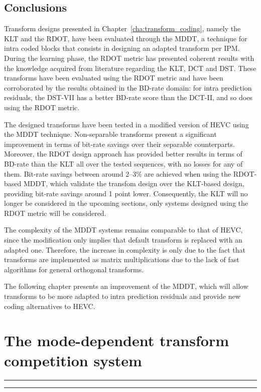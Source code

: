 \documentclass[11pt,a4paper,openright,twoside]{book}
\providecommand{\chaptertoc}{
	\startcontents[chapters]
	\hrule
	\vspace{1em}
	\printcontents[chapters]{}{1}{{\sf\large\bfseries Contents}}
	\hrule
}
\numberwithin{equation}{section} %
\numberwithin{figure}{section} %
\numberwithin{table}{section} %
\begin{document}
\section{Conclusions}
\label{sec:conclusions}

Transform designs presented in Chapter~\ref{cha:transform_coding}, namely the
\ac{KLT} and the \ac{RDOT}, have been evaluated through the \ac{MDDT}, a
technique for intra coded blocks that consists in designing an adapted
transform per \ac{IPM}.
During the learning phase, the \ac{RDOT} metric has presented coherent results
with the knowledge acquired from literature regarding the \ac{KLT}, \ac{DCT}
and \ac{DST}.
These transforms have been evaluated using the \ac{RDOT} metric and have been
corroborated by the results obtained in the \ac{BD}-rate domain:
for intra prediction residuals, the \ac{DST}-VII has a better \ac{BD}-rate
score than the \ac{DCT}-II, and so does using the \ac{RDOT} metric.

The designed transforms have been tested in a modified version of \ac{HEVC}
using the \ac{MDDT} technique.
Non-separable transforms present a significant improvement in terms of
bit-rate savings over their separable counterparts.
Moreover, the \ac{RDOT} design approach has provided better results in terms
of \ac{BD}-rate than the \ac{KLT} all over the tested sequences, with no
losses for any of them.
Bit-rate savings between around 2--3\% are achieved when using the
\ac{RDOT}-based \ac{MDDT}, which validate the transfom design over the
\ac{KLT}-based design, providing bit-rate savings around 1 point lower.
Consequently, the \ac{KLT} will no longer be considered in the upcoming
sections, only systems designed using the \ac{RDOT} metric will be considered.

The complexity of the \ac{MDDT} systems remains comparable to that of
\ac{HEVC}, since the modification only implies that default transform is
replaced with an adapted one.
Therefore, the increase in complexity is only due to the fact that transforms
are implemented as matrix multiplications due to the lack of fast algorithms
for general orthogonal transforms.

The following chapter presents an improvement of the \ac{MDDT}, which will
allow transforms to be more adapted to intra prediction residuals and provide
new coding alternatives to \ac{HEVC}.

\chapter{The mode-dependent transform competition system}
\label{cha:mdtc}
\chaptertoc
\end{document}
